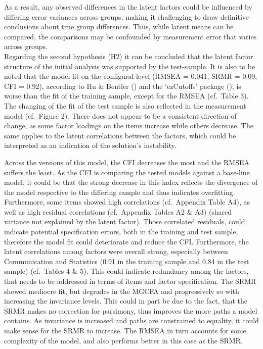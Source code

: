 \documentclass[
  12pt,
  a4paper,
  twoside]{article}
\begin{document}
As a result, any observed differences in the latent factors could be influenced by differing error variances across groups, making it challenging to draw definitive conclusions about true group differences. Thus, while latent means can be compared, the comparisons may be confounded by measurement error that varies across groups.\\
Regarding the second hypothesis (H2) it can be concluded that the latent factor structure of the initial analysis was supported by the test-sample.
It is also to be noted that the model fit on the configural level (RMSEA = 0.041, SRMR = 0.09, CFI = 0.92), according to Hu \& Bentler () and the `ezCutoffs' package (), is worse than the fit of the training sample, except for the RMSEA (cf.~Table 3).
The changing of the fit of the test sample is also reflected in the measurement model (cf.~Figure 2).
There does not appear to be a consistent direction of change, as some factor loadings on the items increase while others decrease.
The same applies to the latent correlations between the factors, which could be interpreted as an indication of the solution's instability.

Across the versions of this model, the CFI decreases the most and the RMSEA suffers the least.
As the CFI is comparing the tested models against a base-line model, it could be that the strong decrease in this index reflects the divergence of the model respective to the differing sample and thus indicates overfitting.
Furthermore, some items showed high correlations (cf.~Appendix Table A4), as well as high residual correlations (cf.~Appendix Tables A2 \& A3) (shared variance not explained by the latent factor).
Those correlated residuals, could indicate potential specification errors, both in the training and test sample, therefore the model fit could deteriorate and reduce the CFI.
Furthermore, the latent correlations among factors were overall strong, especially between Communication and Statistics (0.91 in the training sample and 0.84 in the test sample) (cf.~Tables 4 \& 5).
This could indicate redundancy among the factors, that needs to be addressed in terms of items and factor specification.
The SRMR showed mediocre fit, but degrades in the MGCFA and progressively so with increasing the invariance levels. This could in part be due to the fact, that the SRMR makes no correction for parsimony, thus improves the more paths a model contains.
As invariance is increased and paths are constrained to equality, it could make sense for the SRMR to increase.
The RMSEA in turn accounts for some complexity of the model, and also performs better in this case as the SRMR.
\end{document}
